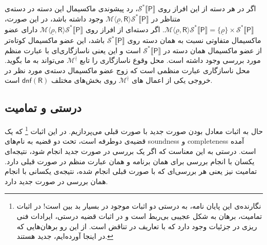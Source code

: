 اگر در هر دسته از این افراز روی 
$\mathcal{S}^* \llbracket \mathsf{P} \rrbracket$،
رد پیشوندی ماکسیمال این دسته در دسته‌ی متناظر در
$\mathcal{M} \langle \underline{\rho}, \mathsf{R} \rangle \mathcal{S}^* \llbracket \mathsf{P} \rrbracket$
 وجود داشته باشد، در این صورت،
$\mathcal{M} \langle \underline{\rho}, \mathsf{R} \rangle \mathcal{S}^* \llbracket \mathsf{P} \rrbracket =\{\underline{\rho}\} \times \mathcal{S}^* \llbracket \mathsf{P} \rrbracket$.
اگر دسته‌ای از افراز روی 
$\mathcal{M} \langle \underline{\rho}, \mathsf{R} \rangle \mathcal{S}^* \llbracket \mathsf{P} \rrbracket$
دارای عضو ماکسیمال متفاوتی نسبت به همان دسته روی 
$\mathcal{S}^* \llbracket \mathsf{P} \rrbracket$
باشد، این عضو ماکسیمال کوتاه‌تر از عضو ماکسیمال همان دسته در 
$\mathcal{S}^* \llbracket \mathsf{P} \rrbracket$
است و این یعنی ناسازگاری‌ای با عبارت منظم مورد بررسی وجود داشته است. محل وقوع ناسازگاری را تابع  
$\mathcal{M}^\nmid$
می‌تواند به ما بگوید. محل ناسازگاری عبارت منظمی است که زوج عضو ماکسیمال دسته‌ی مورد نظر در خروجی یکی از اعمال های 
$\mathcal{M}^\nmid$
روی بخش‌های مختلف 
$\mathsf{dnf(R)}$
است. 




\subsection{درستی و تمامیت}
حال به اثبات معادل بودن صورت جدید با صورت قبلی می‌پردازیم. در \cite{calcul} این اثبات
\footnote{نگارنده‌ی این پایان نامه، به درستی دو اثبات موجود در \cite{calcul} بسیار بد بین است! در اثبات تمامیت، برهان به شکل عجیبی بی‌ربط است و در اثبات قضیه درستی، ایرادات فنی ریزی در جزئیات وجود دارد که با تعاریف در تناقض است. از این رو برهان‌هایی که در اینجا آورده‌ایم، جدید هستند.}
 که یک قضیه‌ی دوطرفه است، تحت دو قضیه به نام‌های \gls{soundness} و \gls{completeness} آمده است. درستی به این معناست که اگر یک بررسی در صورت جدید انجام شود، نتیجه‌ای یکسان با انجام بررسی برای همان برنامه و همان عبارت منظم در صورت قبلی دارد. تمامیت نیز یعنی هر بررسی‌ای که با صورت قبلی انجام شده، نتیجه‌ی یکسانی با انجام همان بررسی در صورت جدید دارد.


